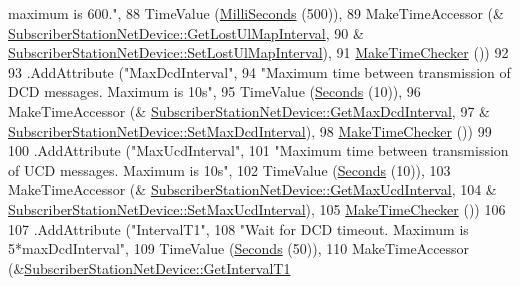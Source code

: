 \begin{DoxyCode}
{       maximum is 600."},
88                    TimeValue (\hyperlink{group__timecivil_gaf26127cf4571146b83a92ee18679c7a9}{MilliSeconds} (500)),
89                    MakeTimeAccessor (&
      \hyperlink{classns3_1_1SubscriberStationNetDevice_a1d99717df71233304f6f1422e4c40140}{SubscriberStationNetDevice::GetLostUlMapInterval},
90                                      &
      \hyperlink{classns3_1_1SubscriberStationNetDevice_a63f2307780be213f889626b12d7607e3}{SubscriberStationNetDevice::SetLostUlMapInterval}),
91                    \hyperlink{group__time_ga7032965bd4afa578691d88c09e4481c1}{MakeTimeChecker} ())
92 
93     .AddAttribute (\textcolor{stringliteral}{"MaxDcdInterval"},
94                    \textcolor{stringliteral}{"Maximum time between transmission of DCD messages. Maximum is 10s"},
95                    TimeValue (\hyperlink{group__timecivil_ga33c34b816f8ff6628e33d5c8e9713b9e}{Seconds} (10)),
96                    MakeTimeAccessor (&
      \hyperlink{classns3_1_1SubscriberStationNetDevice_a628b51a13458fa7abaef5272abffaeee}{SubscriberStationNetDevice::GetMaxDcdInterval},
97                                      &
      \hyperlink{classns3_1_1SubscriberStationNetDevice_a4585da17939328e8b4a1ef4c6834064d}{SubscriberStationNetDevice::SetMaxDcdInterval}),
98                    \hyperlink{group__time_ga7032965bd4afa578691d88c09e4481c1}{MakeTimeChecker} ())
99 
100     .AddAttribute (\textcolor{stringliteral}{"MaxUcdInterval"},
101                    \textcolor{stringliteral}{"Maximum time between transmission of UCD messages. Maximum is 10s"},
102                    TimeValue (\hyperlink{group__timecivil_ga33c34b816f8ff6628e33d5c8e9713b9e}{Seconds} (10)),
103                    MakeTimeAccessor (&
      \hyperlink{classns3_1_1SubscriberStationNetDevice_ad4c349a64630f649abfa8cf9dc12ad55}{SubscriberStationNetDevice::GetMaxUcdInterval},
104                                      &
      \hyperlink{classns3_1_1SubscriberStationNetDevice_afbb70fe7e08bd4230ee03312328fb1b6}{SubscriberStationNetDevice::SetMaxUcdInterval}),
105                    \hyperlink{group__time_ga7032965bd4afa578691d88c09e4481c1}{MakeTimeChecker} ())
106 
107     .AddAttribute (\textcolor{stringliteral}{"IntervalT1"},
108                    \textcolor{stringliteral}{"Wait for DCD timeout. Maximum is 5*maxDcdInterval"},
109                    TimeValue (\hyperlink{group__timecivil_ga33c34b816f8ff6628e33d5c8e9713b9e}{Seconds} (50)),
110                    MakeTimeAccessor (&\hyperlink{classns3_1_1SubscriberStationNetDevice_a40555412fa9dc77df354030168e0d662}{SubscriberStationNetDevice::GetIntervalT1}

\end{DoxyCode}
